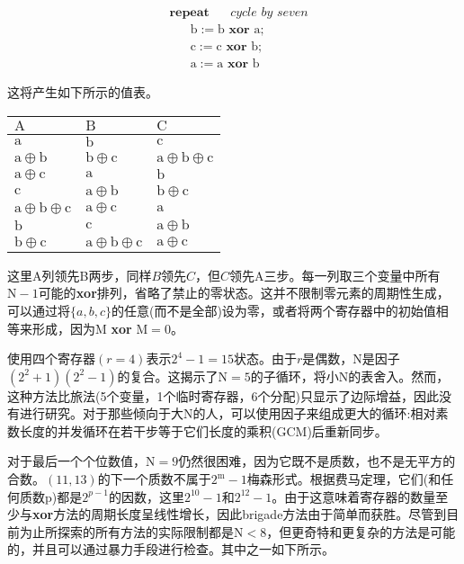 \begin{CJK}{UTF8}{gbsn}
$$
\begin{aligned}
& \textbf { repeat } \quad \textit { cycle by seven }\\
& \qquad \mathrm{b}:=\mathrm{b} \textbf { xor } \mathrm{a} \text {; } \\
& \qquad \mathrm{c}:=\mathrm{c} \textbf { xor } \text{b;} \\
& \qquad \mathrm{a}:=\mathrm{a}\textbf { xor } \mathrm{b}
\end{aligned}
$$

这将产生如下所示的值表。

\begin{center}
\begin{tabular}{lll}
\hline
$\mathrm{A}$ & $\mathrm{B}$ & $\mathrm{C}$ \\
\hline
$\mathrm{a}$ & $\mathrm{b}$ & $\mathrm{c}$ \\
$\mathrm{a} \oplus \mathrm{b}$ & $\mathrm{b} \oplus \mathrm{c}$ & $\mathrm{a} \oplus \mathrm{b} \oplus \mathrm{c}$ \\
$\mathrm{a} \oplus \mathrm{c}$ & $\mathrm{a}$ & $\mathrm{b}$ \\
$\mathrm{c}$ & $\mathrm{a} \oplus \mathrm{b}$ & $\mathrm{b} \oplus \mathrm{c}$ \\
$\mathrm{a} \oplus \mathrm{b} \oplus \mathrm{c}$ & $\mathrm{a} \oplus \mathrm{c}$ & $\mathrm{a}$ \\
$\mathrm{b}$ & $\mathrm{c}$ & $\mathrm{a} \oplus \mathrm{b}$ \\
$\mathrm{b} \oplus \mathrm{c}$ & $\mathrm{a} \oplus \mathrm{b} \oplus \mathrm{c}$ & $\mathrm{a} \oplus \mathrm{c}$ \\
\hline
\end{tabular}
\end{center}
这里A列领先B两步，同样$B$领先$C$，但$C$领先A三步。每一列取三个变量中所有$\mathrm{N}-1$可能的\textbf{xor}排列，省略了禁止的零状态。这并不限制零元素的周期性生成，可以通过将$\{a, b, c\}$的任意(而不是全部)设为零，或者将两个寄存器中的初始值相等来形成，因为$\mathrm{M}$ \textbf{xor} $\mathrm{M}=0$。

使用四个寄存器$(r=4)$表示$2^{4}-1=15$状态。由于$r$是偶数，$\mathrm{N}$是因子$\left(2^{2}+1\right)\left(2^{2} -1\right)$的复合。这揭示了$\mathrm{N}=5$的子循环，将小$\mathrm{N}$的表舍入。然而，这种方法比旅法(5个变量，1个临时寄存器，6个分配)只显示了边际增益，因此没有进行研究。对于那些倾向于大$\mathrm{N}$的人，可以使用因子来组成更大的循环:相对素数长度的并发循环在若干步等于它们长度的乘积(GCM)后重新同步。

对于最后一个个位数值，$\mathrm{N}=9$仍然很困难，因为它既不是质数，也不是无平方的合数。$(11,13)$的下一个质数不属于$2^{\mathrm{m}}-1$梅森形式。根据费马定理，它们(和任何质数p)都是$2^{p-1}$的因数，这里$2^{10}-1$和$2^{12}-1$。由于这意味着寄存器的数量至少与\textbf{xor}方法的周期长度呈线性增长，因此brigade方法由于简单而获胜。尽管到目前为止所探索的所有方法的实际限制都是$\mathrm{N}<8$，但更奇特和更复杂的方法是可能的，并且可以通过暴力手段进行检查。其中之一如下所示。


\end{CJK}
